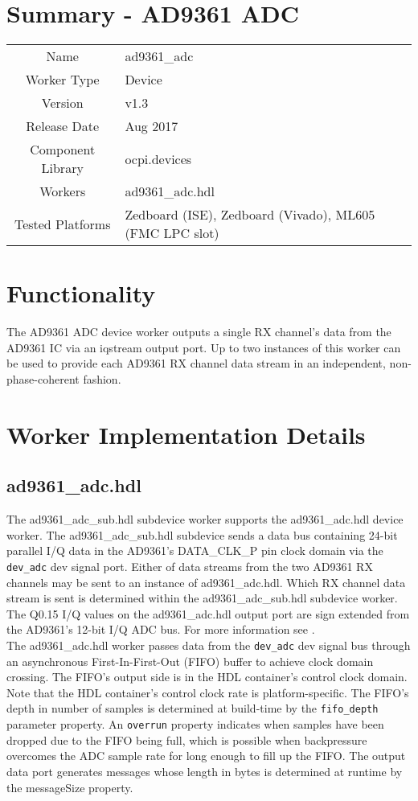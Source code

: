 \documentclass{article}
\author{} %
\date{Version \docVersion} %
\title{\docTitle}
\def\docVersion{1.3}
\def\comp{ad9361\_adc}
\def\Comp{AD9361 ADC}
\begin{document}
\section*{Summary - \Comp}
\begin{tabular}{|c|M{13.5cm}|}
	\hline
	                  &                  \\
	\hline
	Name              & \comp            \\
	\hline
	Worker Type       & Device           \\
	\hline
	Version           & v\docVersion{}   \\
	\hline
	Release Date      & Aug 2017         \\
	\hline
	Component Library & ocpi.devices     \\
	\hline
	Workers           & \comp.hdl        \\
	\hline
	Tested Platforms  & Zedboard (ISE), Zedboard (Vivado), ML605 (FMC LPC slot) \\
	\hline
\end{tabular}
\section*{Functionality}
	The \Comp{} device worker outputs a single RX channel's data from the AD9361 IC\cite{ad9361} via an iqstream output port. Up to two instances of this worker can be used to provide each AD9361 RX channel data stream in an independent, non-phase-coherent fashion.
\section*{Worker Implementation Details}
\subsection*{\comp.hdl}
The ad9361\_adc\_sub.hdl subdevice worker supports the \comp{}.hdl device worker. The ad9361\_adc\_sub.hdl subdevice sends a data bus containing 24-bit parallel I/Q data in the AD9361's DATA\_CLK\_P pin clock domain via the \verb+dev_adc+ dev signal port. Either of data streams from the two AD9361 RX channels  may be sent to an instance of \comp{}.hdl. Which RX channel data stream is sent is determined within the ad9361\_adc\_sub.hdl subdevice worker. The Q0.15 I/Q values on the \comp{}.hdl output port are sign extended from the AD9361's 12-bit I/Q ADC bus. For more information see \cite{adc_sub_comp_datasheet}. \\
The \comp{}.hdl worker passes data from the \verb+dev_adc+ dev signal bus  through an asynchronous First-In-First-Out (FIFO) buffer to achieve clock domain crossing. The FIFO's output side is in the HDL container's control clock domain. Note that the HDL container's control clock rate is platform-specific. The FIFO's depth in number of samples is determined at build-time by the \verb+fifo_depth+ parameter property. An \verb+overrun+ property indicates when samples have been dropped due to the FIFO being full, which is possible when backpressure overcomes the ADC sample rate for long enough to fill up the FIFO. The output data port generates messages whose length in bytes is determined at runtime by the messageSize property.
\end{document}
